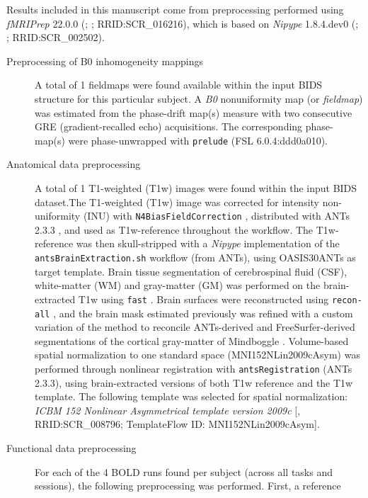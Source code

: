 \documentclass[
]{article}
\author{}
\date{}
\begin{document}
Results included in this manuscript come from preprocessing performed
using \emph{fMRIPrep} 22.0.0 (\citet{fmriprep1}; \citet{fmriprep2};
RRID:SCR\_016216), which is based on \emph{Nipype} 1.8.4.dev0
(\citet{nipype1}; \citet{nipype2}; RRID:SCR\_002502).

\begin{description}
\item[Preprocessing of B0 inhomogeneity mappings]
A total of 1 fieldmaps were found available within the input BIDS
structure for this particular subject. A \emph{B0} nonuniformity map (or
\emph{fieldmap}) was estimated from the phase-drift map(s) measure with
two consecutive GRE (gradient-recalled echo) acquisitions. The
corresponding phase-map(s) were phase-unwrapped with \texttt{prelude}
(FSL 6.0.4:ddd0a010).
\item[Anatomical data preprocessing]
A total of 1 T1-weighted (T1w) images were found within the input BIDS
dataset.The T1-weighted (T1w) image was corrected for intensity
non-uniformity (INU) with \texttt{N4BiasFieldCorrection} \citep{n4},
distributed with ANTs 2.3.3 \citep[RRID:SCR\_004757]{ants}, and used as
T1w-reference throughout the workflow. The T1w-reference was then
skull-stripped with a \emph{Nipype} implementation of the
\texttt{antsBrainExtraction.sh} workflow (from ANTs), using OASIS30ANTs
as target template. Brain tissue segmentation of cerebrospinal fluid
(CSF), white-matter (WM) and gray-matter (GM) was performed on the
brain-extracted T1w using \texttt{fast} \citep[FSL 6.0.4:ddd0a010,
RRID:SCR\_002823,][]{fsl_fast}. Brain surfaces were reconstructed using
\texttt{recon-all} \citep[FreeSurfer 7.2.0,
RRID:SCR\_001847,][]{fs_reconall}, and the brain mask estimated
previously was refined with a custom variation of the method to
reconcile ANTs-derived and FreeSurfer-derived segmentations of the
cortical gray-matter of Mindboggle
\citep[RRID:SCR\_002438,][]{mindboggle}. Volume-based spatial
normalization to one standard space (MNI152NLin2009cAsym) was performed
through nonlinear registration with \texttt{antsRegistration} (ANTs
2.3.3), using brain-extracted versions of both T1w reference and the T1w
template. The following template was selected for spatial normalization:
\emph{ICBM 152 Nonlinear Asymmetrical template version 2009c}
{[}\citet{mni152nlin2009casym}, RRID:SCR\_008796; TemplateFlow ID:
MNI152NLin2009cAsym{]}.
\item[Functional data preprocessing]
For each of the 4 BOLD runs found per subject (across all tasks and
sessions), the following preprocessing was performed. First, a reference

\end{description}
\end{document}
